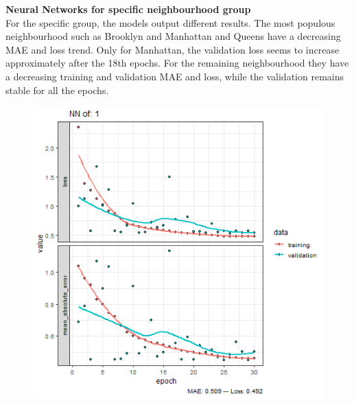 \documentclass{FR16}
\begin{document}
\newpage
\noindent \textbf{Neural Networks for specific neighbourhood group}\\
For the specific group, the models output different results. The most populous neighbourhood such as Brooklyn and Manhattan and Queens have a decreasing MAE and loss trend. Only for Manhattan, the validation loss seems to increase approximately after the 18th epochs. For the remaining neighbourhood they have a decreasing training and validation MAE and loss, while the validation remains stable for all the epochs.
\begin{figure}[!htb]
   \begin{minipage}{0.33\textwidth}
     \centering
     \includegraphics[width=1\linewidth]{figures/NN-1.png} 
   \end{minipage}\hfill
   \begin{minipage}{0.33\textwidth}
     \centering

\end{minipage}
\end{figure}
\end{document}

